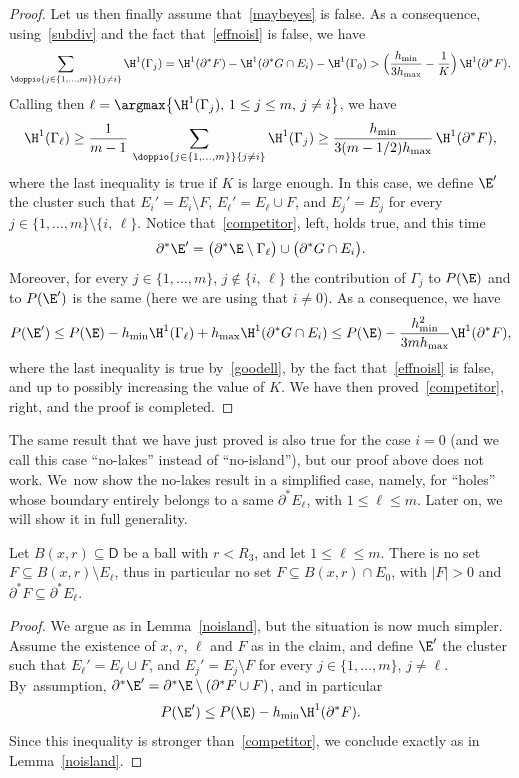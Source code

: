\begin{proof}
Let us then finally assume that~\eqref{maybeyes} is false. As a consequence, using~\eqref{subdiv} and the fact that~\eqref{effnoisl} is false, we have
\[
\sum_{{\doppio{j\in \{1,\dots,m\}}{j\neq i}}} \H^1(\Gamma_j) = \H^1(\partial^* F) - \H^1(\partial^* G\cap E_i) - \H^1(\Gamma_0)
> \Bigl(\frac{h_{\min}}{3h_{\max}}- \frac 1K\Bigr)\, \H^1(\partial^* F).
\]
Calling then $\ell=\argmax \big\{\H^1(\Gamma_j),\, 1\leq j\leq m,\, j\neq i\big\}$, we have
\begin{equation}\label{goodell}
\H^1(\Gamma_\ell)\geq \frac 1 {m-1}\, \sum_{{\doppio{j\in \{1,\dots,m\}}{j\neq i}}} \H^1(\Gamma_j)
\geq \frac{h_{\min}}{3(m-1/2)h_{\max}}\, \H^1(\partial^* F),
\end{equation}
where the last inequality is true if $K$ is large enough. In this case, we define $\E'$ the cluster such that $E_i'=E_i\setminus F$, $E_\ell'=E_\ell\cup F$, and $E_j'=E_j$ for every $j \in \{1,\dots, m\}\setminus \{i,\, \ell\}$. Notice that~\eqref{competitor}, left, holds true, and this time
\[
\partial^* \E' = \big(\partial^* \E \setminus \Gamma_\ell\big) \cup \big(\partial^* G\cap E_i\big).
\]
Moreover, for every $j\in\{1,\dots,m\}$, $j\notin \{i,\,\ell\}$ the contribution of $\Gamma_j$ to $P(\E)$ and to $P(\E')$ is the same (here we are using that $i\neq 0$). As a consequence, we have
\[
P(\E') \leq P(\E) - h_{\min} \H^1(\Gamma_\ell) + h_{\max} \H^1(\partial^* G\cap E_i) \leq P(\E) - \frac{h_{\min}^2}{3mh_{\max}}\H^1(\partial^* F),
\]
where the last inequality is true by~\eqref{goodell}, by the fact that~\eqref{effnoisl} is false, and up to possibly increasing the value of $K$. We have then proved~\eqref{competitor}, right, and the proof is completed.
\end{proof}

The same result that we have just proved is also true for the case $i=0$ (and we call this case ``no-lakes'' instead of ``no-island''), but our proof above does not work. We~now show the no-lakes result in a simplified case, namely, for ``holes'' whose boundary entirely belongs to a same $\partial^* E_\ell$, with $1\leq \ell\leq m$. Later on, we will show it in full generality.

\begin{lem}\label{nolakes}
Let $B(x,r)\subseteq \mathsf{D}$ be a ball with $r< R_3$, and let $1\leq \ell\leq m$. There is no set $F\subseteq B(x,r)\setminus E_\ell$, thus in particular no set $F\subseteq B(x,r)\cap E_0$, with $|F|>0$ and $\partial^* F \subseteq \partial^* E_\ell$.
\end{lem}
\begin{proof}
We argue as in Lemma~\ref{noisland}, but the situation is now much simpler. Assume the existence of $x$, $r$, $\ell$ and $F$ as in the claim, and define $\E'$ the cluster such that $E_\ell'=E_\ell\cup F$, and $E_j'=E_j\setminus F$ for every $j\in\{1,\dots,m\}$, $j\neq \ell$. By~as\-sump\-tion, $\partial^*\E'=\partial^*\E\setminus (\partial^*F\cup F)$, and in particular
\[
P(\E')\leq P(\E) - h_{\min} \H^1(\partial^* F).
\]
Since this inequality is stronger than~\eqref{competitor}, we conclude exactly as in Lemma~\ref{noisland}.
\end{proof}

